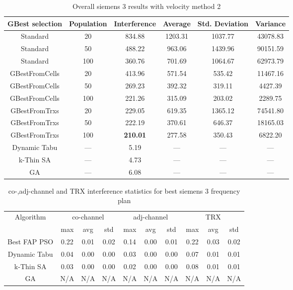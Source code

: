 \begin{table}[H]
\centering
	\begin{tabular}{cccccc}
	\toprule
    GBest selection & Population & Interference & Average & Std. Deviation & Variance \\
    \midrule
    Standard & 20 & 834.88 & 1203.31 & 1037.77 & 43078.83\\
    Standard & 50 & 488.22 & 963.06 & 1439.96 & 90151.59\\
    Standard & 100 & 360.76 & 701.69 & 1064.67 & 62973.79\\
    GBestFromCells & 20 & 413.96 & 571.54 & 535.42 & 11467.16\\
    GBestFromCells & 50 & 269.23 & 392.32 & 319.11 & 4427.39\\
    GBestFromCells & 100 & 221.26 & 315.09 & 203.02 & 2289.75\\
    GBestFromTrxs & 20 & 229.05 & 619.35 & 1365.12 & 74541.80\\
    GBestFromTrxs & 50 & 222.19 & 370.61 & 646.37 & 18165.03\\
    GBestFromTrxs & 100 & \textbf{210.01} & 277.58 & 350.43 & 6822.20\\
    \midrule
    Dynamic Tabu & --- & 5.19 & --- & --- & --- \\
    k-Thin SA & --- & 4.73 & --- & --- & --- \\
    GA & --- & 6.08 & --- & --- & --- \\
    \bottomrule
	\end{tabular}
\caption{Overall siemens 3 results with velocity method 2}
\label{tab:siem3m2}
\end{table}
\begin{table}[H]
\centering
	\begin{tabular}{cccccccccc}
	\toprule
    Algorithm & \multicolumn{3}{c}{co-channel} & \multicolumn{3}{c}{adj-channel} & \multicolumn{3}{c}{TRX}\\
              & max & avg & std
              & max & avg & std
              & max & avg & std\\
    \midrule
    Best FAP PSO & 0.22 & 0.01 & 0.02 & 0.14 & 0.00 & 0.01 & 0.22 & 0.03 & 0.02 \\
    Dynamic Tabu & 0.04 & 0.00 & 0.00 & 0.03 & 0.00 & 0.00 & 0.07 & 0.01 & 0.01\\
    k-Thin SA & 0.03 & 0.00 & 0.00 & 0.02 & 0.00 & 0.00 & 0.08 & 0.01 & 0.01\\
    GA & \scriptsize{N/A} & \scriptsize{N/A} & \scriptsize{N/A} & \scriptsize{N/A} & \scriptsize{N/A} & \scriptsize{N/A} & \scriptsize{N/A} & \scriptsize{N/A} & \scriptsize{N/A}\\
    \bottomrule
	\end{tabular}
\caption{co-,adj-channel and TRX interference statistics for best siemens 3 frequency plan}
\label{tab:stats-siem3m1}
\end{table}
